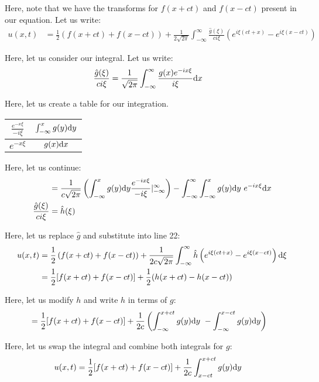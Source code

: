 Here, note that we have the transforms for $f(x+ct)$ and $f(x - ct)$ present in our equation. Let us write:
%
\begin{align}
  u(x, t) & = \frac{1}{2} \left(f(x + ct) + f(x - ct)\right) + \frac{1}{2 \sqrt{2 \pi}} \int^\infty_{-\infty}
  \frac{\hat g(\xi)}{c i \xi}\left( e^{i \xi(c t + x)} - e^{i \xi (x - c t)} \right)
\end{align}

Here, let us consider our integral. Let us write:
%
\begin{align}
  \frac{\hat g(\xi)}{c i \xi}
  & = \frac{1}{\sqrt{2 \pi}} \int^\infty_{-\infty} \frac{g(x) e^{-i x \xi}}{i \xi} \text dx
\end{align}

Here, let us create a table for our integration.
%
\begin{center}
  \begin{tabular}{c|c}
    $\frac{e^{-x \xi}}{- i \xi}$ & $\int^x_{-\infty} g(y) \text dy$\\
    \hline
    $e^{-x \xi}$ & $g(x) \text dx$
  \end{tabular}
\end{center}

Here, let us continue:
%
\begin{align}
  & = \frac{1}{c \sqrt{2 \pi}} \left( \int^x_{-\infty} g(y) \text dy \frac{e^{-i x \xi}}{-i \xi} |^\infty_{-\infty} \right) - \int^\infty_{-\infty} \int^x_{-\infty} g(y) \text dy\ e^{-i x \xi} \text dx\\
  \frac{\hat g(\xi)}{c i \xi} & = \hat h (\xi)
\end{align}

Here, let us replace $\hat g$ and substitute into line 22:
%
\begin{align}
  u(x, t) & = \frac{1}{2} \left(f(x + ct) + f(x - ct)\right) + \frac{1}{2c \sqrt{2 \pi}} \int^\infty_{-\infty}
  \hat h \left( e^{i \xi(c t + x)} - e^{i \xi (x - c t)} \right) \text d\xi\\
  & = \frac{1}{2}[f(x + ct) + f(x - ct)] + \frac{1}{2}(h(x + ct) - h(x - ct))
\end{align}

Here, let us modify $h$ and write $h$ in terms of $g$:
%
\begin{align}
  & = \frac{1}{2}[f(x + ct) + f(x - ct)] + \frac{1}{2c} \left(
  \int^{x + ct}_{-\infty} g(y) \text dy \ - \int^{x - ct}_{-\infty} g(y) \text dy
  \right)
\end{align}

Here, let us swap the integral and combine both integrals for $g$:
%
\begin{align}
  u(x, t)   & = \frac{1}{2}[f(x + ct) + f(x - ct)] + \frac{1}{2c} \int^{x + ct}_{x - ct} g(y) \text dy
\end{align}
